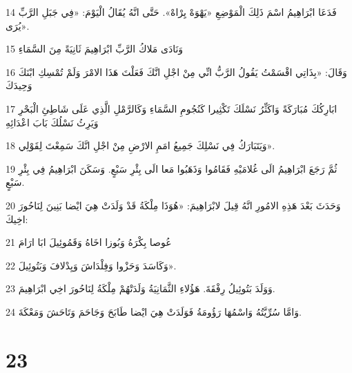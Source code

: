 \par 14 فَدَعَا ابْرَاهِيمُ اسْمَ ذَلِكَ الْمَوْضِعِ «يَهْوَهْ يِرْاهْ». حَتَّى انَّهُ يُقَالُ الْيَوْمَ: «فِي جَبَلِ الرَّبِّ يُرَى».
\par 15 وَنَادَى مَلاكُ الرَّبِّ ابْرَاهِيمَ ثَانِيَةً مِنَ السَّمَاءِ
\par 16 وَقَالَ: «بِذَاتِي اقْسَمْتُ يَقُولُ الرَّبُّ انِّي مِنْ اجْلِ انَّكَ فَعَلْتَ هَذَا الامْرَ وَلَمْ تُمْسِكِ ابْنَكَ وَحِيدَكَ
\par 17 ابَارِكُكَ مُبَارَكَةً وَاكَثِّرُ نَسْلَكَ تَكْثِيرا كَنُجُومِ السَّمَاءِ وَكَالرَّمْلِ الَّذِي عَلَى شَاطِئِ الْبَحْرِ وَيَرِثُ نَسْلُكَ بَابَ اعْدَائِهِ
\par 18 وَيَتَبَارَكُ فِي نَسْلِكَ جَمِيعُ امَمِ الارْضِ مِنْ اجْلِ انَّكَ سَمِعْتَ لِقَوْلِي».
\par 19 ثُمَّ رَجَعَ ابْرَاهِيمُ الَى غُلامَيْهِ فَقَامُوا وَذَهَبُوا مَعا الَى بِئْرِ سَبْعٍ. وَسَكَنَ ابْرَاهِيمُ فِي بِئْرِ سَبْعٍ.
\par 20 وَحَدَثَ بَعْدَ هَذِهِ الامُورِ انَّهُ قِيلَ لابْرَاهِيمَ: «هُوَذَا مِلْكَةُ قَدْ وَلَدَتْ هِيَ ايْضا بَنِينَ لِنَاحُورَ اخِيكَ:
\par 21 عُوصا بِكْرَهُ وَبُوزا اخَاهُ وَقَمُوئِيلَ ابَا ارَامَ
\par 22 وَكَاسَدَ وَحَزْوا وَفِلْدَاشَ وَيِدْلافَ وَبَتُوئِيلَ».
\par 23 وَوَلَدَ بَتُوئِيلُ رِفْقَةَ. هَؤُلاءِ الثَّمَانِيَةُ وَلَدَتْهُمْ مِلْكَةُ لِنَاحُورَ اخِي ابْرَاهِيمَ.
\par 24 وَامَّا سُرِّيَّتُهُ وَاسْمُهَا رَؤُومَةُ فَوَلَدَتْ هِيَ ايْضا طَابَحَ وَجَاحَمَ وَتَاحَشَ وَمَعْكَةَ.

\chapter{23}


